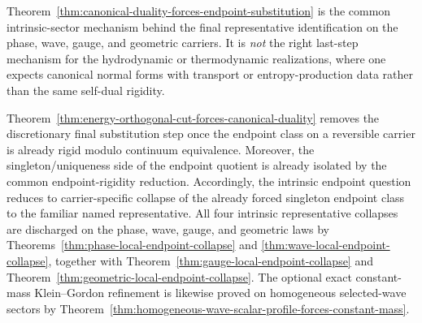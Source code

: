 \begin{remark}
\label{rem:canonical-duality-sector-rigidity}
Theorem~\ref{thm:canonical-duality-forces-endpoint-substitution} is the common
intrinsic-sector mechanism behind the final representative identification on
the phase, wave, gauge, and geometric carriers. It is \emph{not} the right
last-step mechanism for the hydrodynamic or thermodynamic realizations, where
one expects canonical normal forms with transport or entropy-production data
rather than the same self-dual rigidity.
\end{remark}

\begin{remark}
\label{rem:remaining-intrinsic-endpoint-obligations}
Theorem~\ref{thm:energy-orthogonal-cut-forces-canonical-duality} removes the
discretionary final substitution step once the endpoint class on a reversible
carrier is already rigid modulo continuum equivalence. Moreover, the
singleton/uniqueness side of the endpoint quotient is already isolated by the
common endpoint-rigidity reduction. Accordingly, the intrinsic endpoint
question reduces to carrier-specific collapse of the already forced singleton
endpoint class to the familiar named representative. All four intrinsic
representative collapses are discharged on the phase, wave, gauge, and
geometric laws by Theorems~\ref{thm:phase-local-endpoint-collapse} and
\ref{thm:wave-local-endpoint-collapse}, together with
Theorem~\ref{thm:gauge-local-endpoint-collapse} and
Theorem~\ref{thm:geometric-local-endpoint-collapse}. The optional exact
constant-mass Klein--Gordon refinement is likewise proved on homogeneous
selected-wave sectors by
Theorem~\ref{thm:homogeneous-wave-scalar-profile-forces-constant-mass}.
\end{remark}

